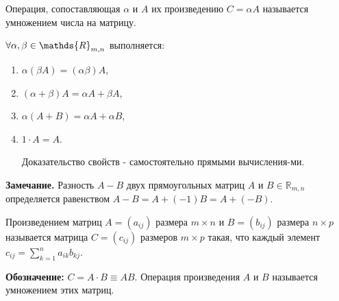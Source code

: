 \noindent Операция, сопоставляющая $\alpha$ и $A$ их произведению $C=\alpha A$ называется умножением числа на матрицу.

\begin{properties}
$\\ \forall \alpha, \beta \in \mathds{R}_{m,n}$ выполняется:
\begin{enumerate}
  \item $\alpha(\beta A) = (\alpha \beta)A$,
  \item $(\alpha + \beta)A = \alpha A + \beta A$,
  \item $\alpha(A+B)=\alpha A + \alpha B$,
  \item $1 \cdot A = A $.

  Доказательство свойств - самостоятельно прямыми вычисления-ми.
\end{enumerate}
\end{properties}

\textbf{Замечание.} Разность $A-B$ двух прямоугольных матриц $A$ и $B \in \mathds{R}_{m,n}$ определяется равенством $A-B=A+(-1)B=A+(-B)$.
\begin{definition}
  Произведением матриц $A=(a_{ij})$ размера $m \times n$ и $B=(b_{ij})$ размера $n \times p$ называется матрица $C=(c_{ij})$ размеров $m \times p$ такая, что каждый элемент $c_{ij}= \sum \limits_{k=1}^n a_{ik}b_{kj}$.
\end{definition}
\noindent \textbf{Обозначение:} $C=A \cdot B \equiv AB$.
Операция произведения $A$ и $B$ называется умножением этих матриц.

